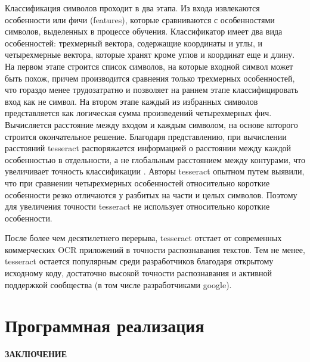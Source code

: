 \documentclass[oneside,final,14pt]{extreport}
\begin{document}
Классификация символов проходит в два этапа. Из входа извлекаются особенности или фичи (features), которые сравниваются с особенностями символов, выделенных в процессе обучения. Классификатор имеет два вида особенностей: трехмерный вектора, содержащие координаты и углы, и четырехмерные вектора, которые хранят кроме углов и координат еще и длину. На первом этапе строится список символов, на которые входной символ может быть похож, причем производится сравнения только трехмерных особенностей, что гораздо менее трудозатратно и позволяет  на раннем этапе классифицировать вход как не символ. На втором этапе каждый из избранных символов представляется как логическая сумма произведений четырехмерных фич. Вычисляется расстояние между входом и каждым символом, на основе которого строится окончательное решение. Благодаря представлению, при вычислении расстояний tesseract распоряжается информацией о расстоянии между каждой особенностью в отдельности, а не глобальным расстоянием между контурами, что увеличивает точность классификации .  Авторы tesseract опытном путем выявили, что при сравнении четырехмерных особенностей относительно короткие особенности резко отличаются у разбитых на части и целых символов. Поэтому для увеличения точности tesseract не использует относительно короткие особенности. 

После более чем десятилетнего перерыва, tesseract отстает от современных коммерческих OCR приложений в точности распознавания текстов. Тем не менее, tesseract остается популярным среди разработчиков благодаря открытому исходному коду, достаточно высокой точности распознавания и активной поддержкой сообщества (в том числе разработчиками google). 
\chapter{Программная реализация}

\newpage
{}
\begin{center}
\bfseries ЗАКЛЮЧЕНИЕ
\end{center}
\end{document}
